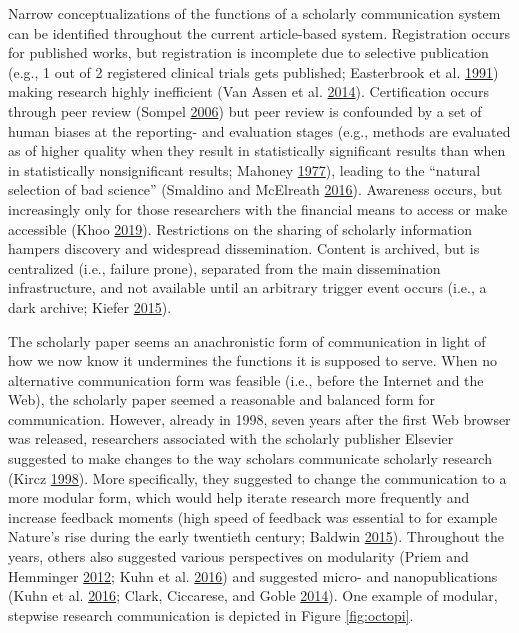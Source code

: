 \documentclass[a5paper]{book}
\begin{document}
Narrow conceptualizations of the functions of a scholarly communication
system can be identified throughout the current article-based system.
Registration occurs for published works, but registration is incomplete
due to selective publication (e.g., 1 out of 2 registered clinical
trials gets published; Easterbrook et al.
\protect\hyperlink{ref-doi:10.1016ux2f0140-6736_91_90201-y}{1991})
making research highly inefficient (Van Assen et al.
\protect\hyperlink{ref-doi:10.1371ux2fjournal.pone.0084896}{2014}).
Certification occurs through peer review (Sompel
\protect\hyperlink{ref-doi:10.1038ux2fnature05008}{2006}) but peer
review is confounded by a set of human biases at the reporting- and
evaluation stages (e.g., methods are evaluated as of higher quality when
they result in statistically significant results than when in
statistically nonsignificant results; Mahoney
\protect\hyperlink{ref-doi:10.1007ux2fbf01173636}{1977}), leading to the
\enquote{natural selection of bad science} (Smaldino and McElreath
\protect\hyperlink{ref-doi:10.1098ux2frsos.160384}{2016}). Awareness
occurs, but increasingly only for those researchers with the financial
means to access or make accessible (Khoo
\protect\hyperlink{ref-doi:10.18352ux2flq.10280}{2019}). Restrictions on
the sharing of scholarly information hampers discovery and widespread
dissemination. Content is archived, but is centralized (i.e., failure
prone), separated from the main dissemination infrastructure, and not
available until an arbitrary trigger event occurs (i.e., a dark archive;
Kiefer \protect\hyperlink{ref-doi:10.1629ux2fuksg.215}{2015}).

The scholarly paper seems an anachronistic form of communication in
light of how we now know it undermines the functions it is supposed to
serve. When no alternative communication form was feasible (i.e., before
the Internet and the Web), the scholarly paper seemed a reasonable and
balanced form for communication. However, already in 1998, seven years
after the first Web browser was released, researchers associated with
the scholarly publisher Elsevier suggested to make changes to the way
scholars communicate scholarly research (Kircz
\protect\hyperlink{ref-doi:10.1108ux2feum0000000007185}{1998}). More
specifically, they suggested to change the communication to a more
modular form, which would help iterate research more frequently and
increase feedback moments (high speed of feedback was essential to for
example Nature's rise during the early twentieth century; Baldwin
\protect\hyperlink{ref-isbn:9780226261454}{2015}). Throughout the years,
others also suggested various perspectives on modularity (Priem and
Hemminger \protect\hyperlink{ref-doi:10.3389ux2ffncom.2012.00019}{2012};
Kuhn et al. \protect\hyperlink{ref-doi:10.7717ux2fpeerj-cs.78}{2016})
and suggested micro- and nanopublications (Kuhn et al.
\protect\hyperlink{ref-doi:10.7717ux2fpeerj-cs.78}{2016}; Clark,
Ciccarese, and Goble
\protect\hyperlink{ref-doi:10.1186ux2f2041-1480-5-28}{2014}). One
example of modular, stepwise research communication is depicted in
Figure \ref{fig:octopi}.
\end{document}
